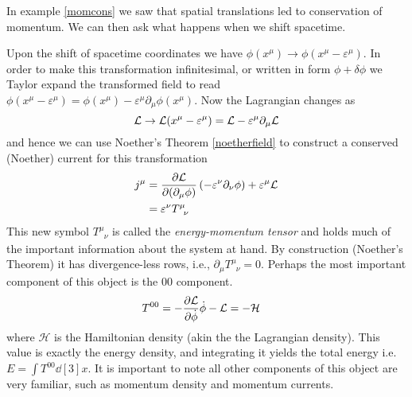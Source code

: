 In example \ref{momcons} we saw that spatial translations led to conservation of momentum. We can then ask what happens when we shift spacetime.
\begin{example}\label{ex:enmomtensor}
Upon the shift of spacetime coordinates we have $\phi(x^\mu)\to\phi(x^\mu - \varepsilon^\mu)$. In order to make this transformation infinitesimal, or written in form $\phi + \delta\phi$ we Taylor expand the transformed field to read $\phi(x^\mu - \varepsilon^\mu) = \phi(x^\mu) - \varepsilon^\mu\partial_\mu\phi(x^\mu)$. Now the Lagrangian changes as
\begin{equation}
\mathcal{L}\to \mathcal{L}(x^\mu - \varepsilon^\mu) = \mathcal{L} - \varepsilon^\mu\partial_\mu\mathcal{L}
\end{equation}
and hence we can use Noether's Theorem \ref{noetherfield} to construct a conserved (Noether) current for this transformation
\begin{align}\label{eq:enmomtensor}
j^\mu & = \pdv{\mathcal{L}}{(\partial_\mu\phi)}\left(-\varepsilon^\nu\partial_\nu\phi\right) + \varepsilon^\mu\mathcal{L} \\
 & = \varepsilon^\nu T^\mu_{\phantom{\mu}\nu}
\end{align}
This new symbol $T^\mu_{\phantom{\mu}\nu}$ is called the \textit{energy-momentum tensor} and holds much of the important information about the system at hand. By construction (Noether's Theorem) it has divergence-less rows, i.e., $\partial_\mu T^\mu_{\phantom{\mu}\nu} = 0$. Perhaps the most important component of this object is the $00$ component.
\begin{align}
T^{00} & = -\pdv{\mathcal{L}}{\dot{\phi}}\dot{\phi} - \mathcal{L} = -\mathcal{H}
\end{align}
where $\mathcal{H}$ is the Hamiltonian density (akin the the Lagrangian density). This value is exactly the energy density, and integrating it yields the total energy i.e. $E = \int T^{00}\dd[3]{x}$. It is important to note all other components of this object are very familiar, such as momentum density and momentum currents.
\end{example}
